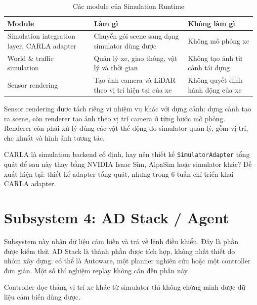 \begin{table}[H]
  \centering
  \small
  \caption{Các module của Simulation Runtime}
  \begin{tabularx}{\linewidth}{>{\raggedright\arraybackslash}p{3.6cm} >{\raggedright\arraybackslash}X >{\raggedright\arraybackslash}X}
    \toprule
    \textbf{Module} & \textbf{Làm gì} & \textbf{Không làm gì} \\
    \midrule
    Simulation integration layer, CARLA adapter & Chuyển gói scene sang dạng simulator dùng được & Không mô phỏng xe \\
    \addlinespace
    World \& traffic simulation & Quản lý xe, giao thông, vật lý và thời gian & Không tạo ảnh từ cảnh tái dựng \\
    \addlinespace
    Sensor rendering & Tạo ảnh camera và LiDAR theo vị trí hiện tại của xe & Không quyết định hành động của xe \\
    \bottomrule
  \end{tabularx}
\end{table}

Sensor rendering được tách riêng vì nhiệm vụ khác với dựng cảnh: dựng cảnh tạo ra scene, còn renderer tạo ảnh theo vị trí camera ở từng bước mô phỏng.
Renderer còn phải xử lý đúng các vật thể động do simulator quản lý, gồm vị trí, che khuất và hình ảnh tương tác.

\begin{question}
CARLA là simulation backend cố định, hay nên thiết kế \texttt{SimulatorAdapter} tổng quát để sau này thay bằng NVIDIA Isaac Sim, AlpaSim hoặc simulator khác?
Đề xuất hiện tại: thiết kế adapter tổng quát, nhưng trong 6 tuần chỉ triển khai CARLA adapter.
\end{question}

\section{Subsystem 4: AD Stack / Agent}

Subsystem này nhận dữ liệu cảm biến và trả về lệnh điều khiển. Đây là phần được kiểm thử.
AD Stack là thành phần được tích hợp, không nhất thiết do nhóm xây dựng: có thể là Autoware, một planner nghiên cứu hoặc một controller đơn giản.
Một số thí nghiệm replay không cần đến phần này.

\begin{warning}
Controller đọc thẳng vị trí xe khác từ simulator thì không chứng minh được dữ liệu cảm biến dùng được.
\end{warning}

